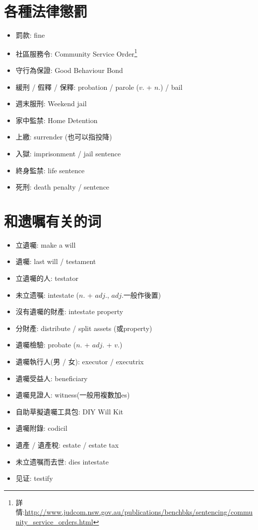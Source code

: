 \section{各種法律懲罰}
\begin{multicols}{2}
\begin{itemize}
  \itemsep0em
  \item 罰款: fine
  \item 社區服務令: Community Service Order\footnote{詳情:\url{http://www.judcom.nsw.gov.au/publications/benchbks/sentencing/community_service_orders.html}}
  \item 守行為保證: Good Behaviour Bond
  \item 緩刑 / 假釋 / 保釋: probation / parole ($v.$ + $n.$) / bail
  \item 週末服刑: Weekend jail
  \item 家中監禁: Home Detention
  \item 上繳: surrender (也可以指投降)
  \item 入獄: imprisonment / jail sentence
  \item 終身監禁: life sentence
  \item 死刑: death penalty / sentence
\end{itemize}
\end{multicols}

\section{和遗嘱有关的词}
\begin{multicols}{2}
\begin{itemize}
  \itemsep0em
  \item 立遺囑: make a will
  \item 遺囑: last will / testament
  \item 立遺囑的人: testator
  \item 未立遗嘱: intestate ($n.$ + $adj.$, $adj.$一般作後置)
  \item 沒有遺囑的財產: intestate property
  \item 分財產: distribute / split assets (或property)
  \item 遺囑檢驗: probate ($n.$ + $adj.$ + $v.$)
  \item 遺囑執行人(男 / 女): executor / executrix
  \item 遺囑受益人: beneficiary
  \item 遺囑見證人: witness(一般用複數加es)
  \item 自助草擬遺囑工具包: DIY Will Kit
  \item 遺囑附錄: codicil
  \item 遺產 / 遺產稅: estate / estate tax
  \item 未立遗嘱而去世: dies intestate
  \item 见证: testify
\end{itemize}
\end{multicols}

